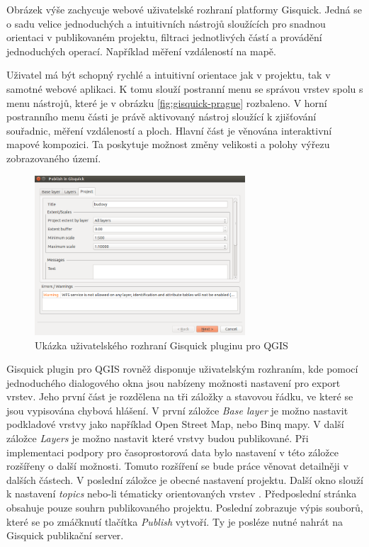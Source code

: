 Obrázek výše zachycuje webové uživatelské rozhraní platformy
Gisquick. Jedná se o sadu velice jednoduchých a intuitivních nástrojů
sloužících pro snadnou orientaci v publikovaném projektu, filtraci
jednotlivých částí a provádění jednoduchých operací. Například
měření vzdáleností na mapě.

Uživatel má být schopný rychlé a intuitivní orientace jak v projektu,
tak v samotné webové aplikaci. K tomu slouží postranní menu se správou
vrstev spolu s menu nástrojů, které je v obrázku \ref{fig:gisquick-prague}
rozbaleno. V horní postranního menu části je právě aktivovaný
nástroj sloužící k zjišťování souřadnic, měření vzdáleností
a ploch. Hlavní část je věnována interaktivní mapové kompozici. Ta
poskytuje možnost změny velikosti a polohy výřezu zobrazovaného území.

\begin{figure}[h!]
\centering
\includegraphics[width=0.7\textwidth]{../img/gisquick_plugin.png}
\caption{Ukázka uživatelského rozhraní Gisquick pluginu pro QGIS}
\label{fig:gisquick-plugin}
\end{figure}

\newpage
Gisquick plugin pro QGIS rovněž disponuje uživatelským rozhraním, kde
pomocí jednoduchého dialogového okna jsou nabízeny možnosti nastavení
pro export vrstev. Jeho první část je rozdělena na tři záložky a
stavovou řádku, ve které se jsou vypisována chybová hlášení. V
první záložce \textit{Base layer} je možno nastavit podkladové vrstvy
jako například Open Street Map, nebo Binq mapy. V další záložce
\textit{Layers} je možno nastavit které vrstvy budou publikované. Při
implementaci podpory pro časoprostorová data bylo nastavení v této
záložce rozšířeny o další možnosti. Tomuto rozšíření se bude
práce věnovat detailněji v dalších částech. V poslední záložce je
obecné nastavení projektu. Další okno slouží k nastavení \textit{topics}
nebo-li tématicky orientovaných vrstev \cite{gisquick-manual}. Předposlední
stránka obsahuje pouze souhrn publikovaného projektu. Poslední zobrazuje
výpis souborů, které se po zmáčknutí tlačítka \textit{Publish}
vytvoří. Ty je posléze nutné nahrát na Gisquick publikační server.

